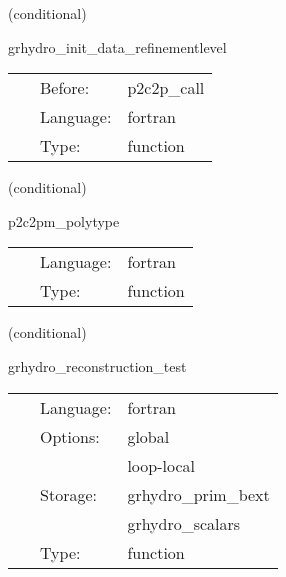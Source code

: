    (conditional) 

\hspace{5mm} grhydro\_init\_data\_refinementlevel 

\hspace{5mm}{\it calculate current refinement level } 


\hspace{5mm}

 \begin{tabular*}{160mm}{cll} 
~ & Before:  & p2c2p\_call \\ 
~ & Language:  & fortran \\ 
~ & Type:  & function \\ 
\end{tabular*} 


\vspace{5mm}

   (conditional) 

\hspace{5mm} p2c2pm\_polytype 

\hspace{5mm}{\it testing primitive to conservative to primitive - mhd polytype version } 


\hspace{5mm}

 \begin{tabular*}{160mm}{cll} 
~ & Language:  & fortran \\ 
~ & Type:  & function \\ 
\end{tabular*} 


\vspace{5mm}

   (conditional) 

\hspace{5mm} grhydro\_reconstruction\_test 

\hspace{5mm}{\it testing the reconstruction } 


\hspace{5mm}

 \begin{tabular*}{160mm}{cll} 
~ & Language:  & fortran \\ 
~ & Options:  & global \\ 
~& ~ &loop-local\\ 
~ & Storage:  & grhydro\_prim\_bext \\ 
~& ~ &grhydro\_scalars\\ 
~ & Type:  & function \\ 
\end{tabular*} 


